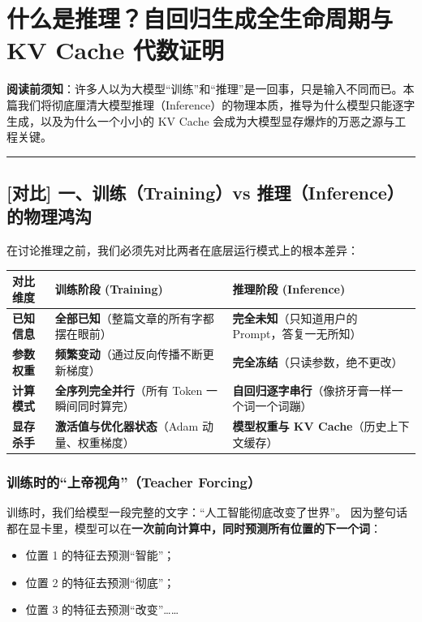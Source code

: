 \chapter{什么是推理？自回归生成全生命周期与 KV Cache 代数证明}

\begin{mathBox}[核心数学定理推导]
\textbf{阅读前须知}：许多人以为大模型“训练”和“推理”是一回事，只是输入不同而已。本篇我们将彻底厘清大模型推理（Inference）的物理本质，推导为什么模型只能逐字生成，以及为什么一个小小的 KV Cache 会成为大模型显存爆炸的万恶之源与工程关键。
\end{mathBox}

\vspace{0.8em}\hrule\vspace{0.8em}

\section{[对比] 一、训练（Training）vs 推理（Inference）的物理鸿沟}

在讨论推理之前，我们必须先对比两者在底层运行模式上的根本差异：

\begin{center}
\small
\begin{tabularx}{\textwidth}{p{3cm} p{4.5cm} X}
\toprule
\textbf{对比维度} & \textbf{训练阶段 (Training)} & \textbf{推理阶段 (Inference)} \\
\midrule
\textbf{已知信息} & \textbf{全部已知}（整篇文章的所有字都摆在眼前） & \textbf{完全未知}（只知道用户的 Prompt，答复一无所知） \\
\textbf{参数权重} & \textbf{频繁变动}（通过反向传播不断更新梯度） & \textbf{完全冻结}（只读参数，绝不更改） \\
\textbf{计算模式} & \textbf{全序列完全并行}（所有 Token 一瞬间同时算完） & \textbf{自回归逐字串行}（像挤牙膏一样一个词一个词蹦） \\
\textbf{显存杀手} & \textbf{激活值与优化器状态}（Adam 动量、权重梯度） & \textbf{模型权重与 KV Cache}（历史上下文缓存） \\
\bottomrule
\end{tabularx}
\end{center}

\subsection{训练时的“上帝视角”（Teacher Forcing）}

训练时，我们给模型一段完整的文字：“人工智能彻底改变了世界”。
因为整句话都在显卡里，模型可以在\textbf{一次前向计算中，同时预测所有位置的下一个词}：
\begin{itemize}
  \item 位置 1 的特征去预测“智能”；
  \item 位置 2 的特征去预测“彻底”；
  \item 位置 3 的特征去预测“改变”\dots{}\dots{}
\end{itemize}

